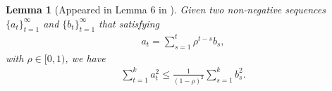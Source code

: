 \documentclass{article}
\newtheorem{Lemma}{\bf{Lemma}}
\begin{document}
\begin{Lemma}[Appeared in Lemma $6$ in \citep{Tang:2018un}]
\label{lemma_hanlin_2}
Given two non-negative sequences $\{a_t\}_{t=1}^{\infty}$ and $\{b_t\}_{t=1}^{\infty}$ that satisfying
\begin{align}
\nonumber
a_t = \sum_{s=1}^t \rho^{t-s} b_s,
\end{align} with $\rho \in [0,1)$, we have
\begin{align}
\nonumber
\sum_{t=1}^k a_t^2 \le \frac{1}{(1-\rho)^2}\sum_{s=1}^k b_s^2.
\end{align}
\end{Lemma}


















\end{document}
